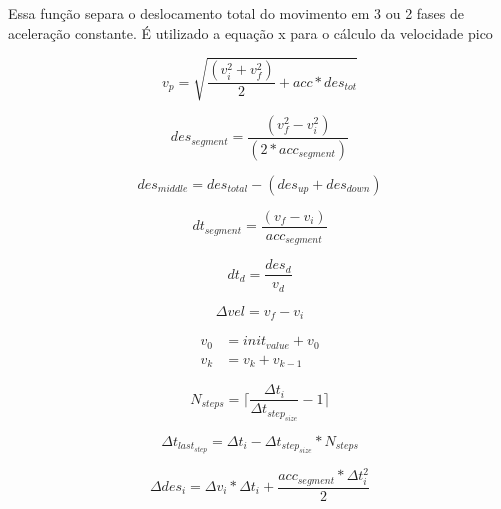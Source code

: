Essa função separa o deslocamento total do movimento em 3 ou 2 fases de aceleração constante.
É utilizado a equação x para o cálculo da velocidade pico

\begin{equation}
    \label{eq:v_p}
    v_p = \sqrt{\frac{(v_i^2+v_f^2)}{2}+acc*des_{tot}}
\end{equation}

\begin{equation}
    \label{eq:des_seg_acc}
    des_{segment} = \frac{(v_f^2-v_i^2)}{(2*acc_{segment})}
\end{equation}

\begin{equation}
    \label{eq:des_seg_no_acc}
    des_{middle} = des_{total}-(des_{up}+des_{down})
\end{equation}

\begin{equation}
    \label{eq:dt_seg_acc}
    dt_{segment} = \frac{(v_f-v_i)}{acc_{segment}}
\end{equation}

\begin{equation}
    \label{eq:dt_seg_no_acc}
    dt_d = \frac{des_d}{v_d}
\end{equation}

\begin{equation}
    \label{eq:delta_vel}
    \Delta vel = v_f-v_i
\end{equation}

\begin{equation}
    \label{eq:acumulator_function}
    \begin{split}
        v_{0} &= init_{value} + v_{0} \\
        v_k &= v_k+v_{k-1}
    \end{split}
\end{equation}

\begin{equation}
    \label{eq:N_steps}
    N_{steps} = \lceil\frac{\Delta t_i}{\Delta t_{step_{size}}}-1\rceil
\end{equation}

\begin{equation}
    \label{eq:dt_interpol_last_step}
    \Delta t_{last_{step}}= \Delta t_i - \Delta t_{step_{size}}*N_{steps} 
\end{equation}

\begin{equation}
    \label{eq:delta_des_interpol}
    \Delta des_i = \Delta v_i*\Delta t_i+ \frac{acc_{segment}*\Delta t_i^2}{2} 
\end{equation}


